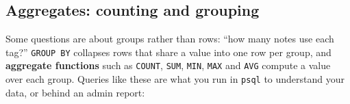 \subsection*{Aggregates: counting and grouping}\label{33-logic-execution:aggregates-counting-and-grouping}

Some questions are about groups rather than rows: ``how many notes use each tag?'' \texttt{GROUP\ BY} collapses rows that share a value into one row per group, and \textbf{aggregate functions} such as \texttt{COUNT}, \texttt{SUM}, \texttt{MIN}, \texttt{MAX} and \texttt{AVG} compute a value over each group. Queries like these are what you run in \texttt{psql} to understand your data, or behind an admin report:

\begin{codebox}[short]

\begin{Shaded}
\begin{Highlighting}[]
 \OperatorTok{=}
 
 

\NormalTok{(}\OperatorTok{*}\NormalTok{) }
\OperatorTok{=}
 
 \NormalTok{(}\OperatorTok{*}\NormalTok{) }\OperatorTok{\textgreater{}=} \NormalTok{;}

  \NormalTok{ (}  \OperatorTok{=}\NormalTok{);}
\end{Highlighting}
\end{Shaded}

\end{codebox}

